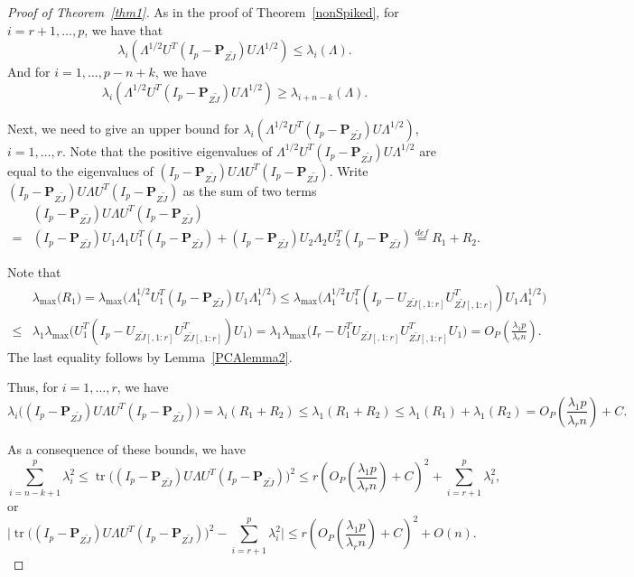 \documentclass[12pt]{article} %
\DeclareMathOperator{\mytr}{tr}
\newcommand{\bP}{\mathbf{P}}
\theoremstyle{definition}
\begin{document}
\begin{proof}[\textrm{Proof of Theorem~\ref{thm1}}]
    As in the proof of Theorem~\ref{nonSpiked}, for $i=r+1,\ldots, p$, we have  that
    \begin{equation}
    \lambda_i (\Lambda^{1/2}U^T (I_p-\bP_{Z\tilde{J}})U\Lambda^{1/2})\leq
    \lambda_i (\Lambda).
    \end{equation}
     And for $i=1,\ldots, p-n+k$, we have
    \begin{equation}
    \lambda_i (\Lambda^{1/2}U^T (I_p-\bP_{Z\tilde{J}})U\Lambda^{1/2})\geq
    \lambda_{i+n-k} (\Lambda).
    \end{equation}

    Next, we need to give an upper bound for $\lambda_i(\Lambda^{1/2}U^T (I_p-\bP_{Z\tilde{J}})U\Lambda^{1/2})$, $i=1,\ldots,r$.
    Note that the positive eigenvalues of $\Lambda^{1/2}U^T (I_p-\bP_{Z\tilde{J}})U\Lambda^{1/2}$ are equal to the eigenvalues of $(I_p-\bP_{Z\tilde{J}})U\Lambda U^T (I_p-\bP_{Z\tilde{J}})$.
Write $(I_p-\bP_{Z\tilde{J}})U\Lambda U^T (I_p-\bP_{Z\tilde{J}})$ as the sum of two terms
$$
\begin{aligned}
&(I_p-\bP_{Z\tilde{J}})U\Lambda U^T (I_p-\bP_{Z\tilde{J}})
\\
=&
(I_p-\bP_{Z\tilde{J}})U_1\Lambda_1 U_1^T(I_p-\bP_{Z\tilde{J}})+(I_p-\bP_{Z\tilde{J}})U_2\Lambda_2 U_2^T (I_p-\bP_{Z\tilde{J}})
\overset{def}{=}R_1+R_2.
\end{aligned}
$$

Note that
$$
\begin{aligned}
&\lambda_{\max}\big( R_1 \big)
=
\lambda_{\max}\big(\Lambda_1^{1/2} U_1^T(I_p-\bP_{Z\tilde{J}}) U_1 \Lambda_1^{1/2}\big)
\leq 
\lambda_{\max}\big(\Lambda_1^{1/2} U_1^T(I_p-U_{Z\tilde{J}[,1:r]}U_{Z\tilde{J}[,1:r]}^T) U_1 \Lambda_1^{1/2}\big)\\
\leq &
\lambda_1
\lambda_{\max}\big(U_1^T(I_p-U_{Z\tilde{J}[,1:r]}U_{Z\tilde{J}[,1:r]}^T) U_1 \big)
= 
\lambda_1
\lambda_{\max}\big(I_r - U_1^TU_{Z\tilde{J}[,1:r]}U_{Z\tilde{J}[,1:r]}^T U_1 \big)=O_P(\frac{\lambda_1 p}{\lambda_r n}).
\end{aligned}
$$
    The last equality follows by Lemma~\ref{PCAlemma2}.

Thus, for $i=1,\ldots, r$, we have
$$
    \lambda_i\big((I_p-\bP_{Z\tilde{J}})U\Lambda U^T (I_p-\bP_{Z\tilde{J}})\big)=
\lambda_i(R_1+R_2)\leq
\lambda_1(R_1+R_2)\leq \lambda_1(R_1)+\lambda_1(R_2)= O_P(\frac{\lambda_1 p}{\lambda_r n}) + C.
$$

As a consequence of these bounds, we have
$$
    \sum_{i=n-k+1}^p \lambda_i^2\leq \mytr\big((I_p-\bP_{Z\tilde{J}})U\Lambda U^T (I_p-\bP_{Z\tilde{J}})\big)^2 \leq  r(O_P(\frac{\lambda_1 p}{\lambda_r n})+C)^2+\sum_{i=r+1}^p \lambda_i^2,
$$
or
    \begin{equation}\label{eq:spiketrace1}
    \big|\mytr\big((I_p-\bP_{Z\tilde{J}})U\Lambda U^T (I_p-\bP_{Z\tilde{J}})\big)^2 - \sum_{i=r+1}^p \lambda_i^2 \big|\leq 
    r(O_P(\frac{\lambda_1 p}{\lambda_r n})+C)^2+O(n).
    \end{equation}


\end{proof}
\end{document}
